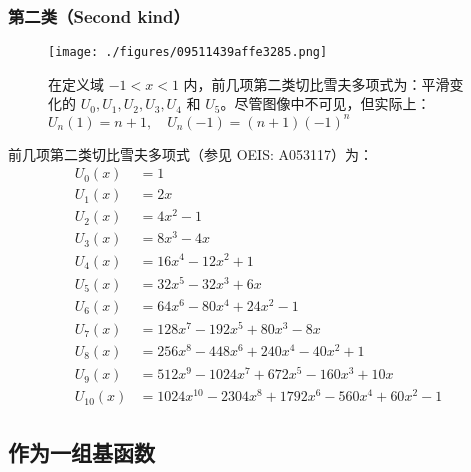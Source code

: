 \subsubsection{第二类（Second kind）}
\begin{figure}[ht]
\centering
\texttt{[image: ./figures/09511439affe3285.png]}
\caption{在定义域 $-1 < x < 1$ 内，前几项第二类切比雪夫多项式为：平滑变化的 $U_0, U_1, U_2, U_3, U_4$ 和 $U_5$。尽管图像中不可见，但实际上：$U_n(1) = n + 1,\quad U_n(-1) = (n + 1)(-1)^n$} \label{fig_QBXFdx_4}
\end{figure}
前几项第二类切比雪夫多项式（参见 OEIS: A053117）为：
$$
\begin{aligned}
U_0(x) &= 1 \\
U_1(x) &= 2x \\
U_2(x) &= 4x^2 - 1 \\
U_3(x) &= 8x^3 - 4x \\
U_4(x) &= 16x^4 - 12x^2 + 1 \\
U_5(x) &= 32x^5 - 32x^3 + 6x \\
U_6(x) &= 64x^6 - 80x^4 + 24x^2 - 1 \\
U_7(x) &= 128x^7 - 192x^5 + 80x^3 - 8x \\
U_8(x) &= 256x^8 - 448x^6 + 240x^4 - 40x^2 + 1 \\
U_9(x) &= 512x^9 - 1024x^7 + 672x^5 - 160x^3 + 10x \\
U_{10}(x) &= 1024x^{10} - 2304x^8 + 1792x^6 - 560x^4 + 60x^2 - 1
\end{aligned}~
$$
\subsection{作为一组基函数}